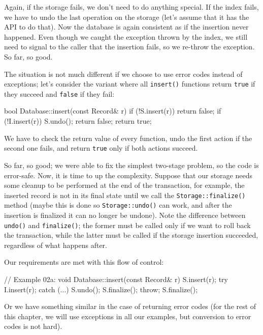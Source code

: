 Again, if the storage fails, we don't need to do anything special. If the index fails, we have to undo the last operation on the storage (let's assume that it has the API to do that). Now the database is again consistent as if the insertion never happened. Even though we caught the exception thrown by the index, we still need to signal to the caller that the insertion fails, so we re-throw the exception. So far, so good.

The situation is not much different if we choose to use error codes instead of exceptions; let's consider the variant where all \texttt{insert()} functions return \texttt{true} if they succeed and \texttt{false} if they fail:

\begin{code}
bool Database::insert(const Record& r) {
  if (!S.insert(r)) return false;
  if (!I.insert(r)) {
    S.undo();
    return false;
  }
  return true;
}
\end{code}

We have to check the return value of every function, undo the first action if the second one fails, and return \texttt{true} only if both actions succeed.

So far, so good; we were able to fix the simplest two-stage problem, so the code is error-safe. Now, it is time to up the complexity. Suppose that our storage needs some cleanup to be performed at the end of the transaction, for example, the inserted record is not in its final state until we call the \texttt{Storage::finalize()} method (maybe this is done so \texttt{Storage::undo()} can work, and after the insertion is finalized it can no longer be undone). Note the difference between \texttt{undo()} and \texttt{finalize()}; the former must be called only if we want to roll back the transaction, while the latter must be called if the storage insertion succeeded, regardless of what happens after.

Our requirements are met with this flow of control:

\begin{code}
// Example 02a:
void Database::insert(const Record& r) {
  S.insert(r);
  try {
    I.insert(r);
  } catch (...) {
    S.undo();
    S.finalize();
    throw;
  }
  S.finalize();
}
\end{code}

Or we have something similar in the case of returning error codes (for the rest of this chapter, we will use exceptions in all our examples, but conversion to error codes is not hard).

